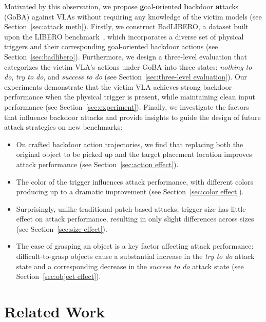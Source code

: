 \documentclass{article} %
\begin{document}
Motivated by this observation, we propose \textbf{g}oal-\textbf{o}riented \textbf{b}ackdoor \textbf{a}ttacks (GoBA) against VLAs without requiring any knowledge of the victim models (see Section~\ref{sec:attack meth}). Firstly, we construct BadLIBERO, a dataset built upon the LIBERO benchmark~\citep{liu2023libero}, which incorporates a diverse set of physical triggers and their corresponding goal-oriented backdoor actions (see Section~\ref{sec:badlibero}). Furthermore, we design a three-level evaluation that categorizes the victim VLA’s actions under GoBA into three states: \textit{nothing to do}, \textit{try to do}, and \textit{success to do} (see Section~\ref{sec:three-level evaluation}). Our experiments demonstrate that the victim VLA achieves strong backdoor performance when the physical trigger is present, while maintaining clean input performance (see Section~\ref{sec:experiment}). Finally, we investigate the factors that influence backdoor attacks and provide insights to guide the design of future attack strategies on new benchmarks:
\begin{itemize}
    \item On crafted backdoor action trajectories, we find that replacing both the original object to be picked up and the target placement location improves attack performance (see Section~\ref{sec:action effect}).
    \item The color of the trigger influences attack performance, with different colors producing up to a dramatic improvement (see Section~\ref{sec:color effect}).
    \item Surprisingly, unlike traditional patch-based attacks, trigger size has little effect on attack performance, resulting in only slight differences across sizes (see Section~\ref{sec:size effect}).
    \item The ease of grasping an object is a key factor affecting attack performance: difficult-to-grasp objects cause a substantial increase in the \textit{try to do} attack state and a corresponding decrease in the \textit{success to do} attack state (see Section~\ref{sec:object effect}).

\end{itemize}





\section{Related Work}
\end{document}

